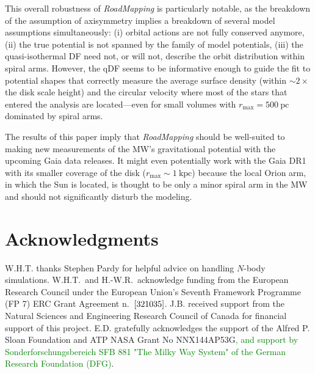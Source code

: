 \documentclass[iop,revtex4,numberedappendix,appendixfloats]{emulateapj}
\newcommand{\RM}{{\sl RoadMapping}}
\newcommand{\NEW}[1]{\textcolor{Green}{#1}}
\newcommand{\OLD}[1]{}
\begin{document}
This overall robustness of \RM{} is particularly notable, as the breakdown of the assumption of axisymmetry implies a breakdown of several model assumptions simultaneously: (i) orbital actions are not fully conserved anymore, (ii) the true potential is not spanned by the family of model potentials, (iii) the quasi-isothermal DF need not, or will not, describe the orbit distribution within spiral arms. However, the qDF seems to be informative enough to guide the fit to potential shapes that correctly measure the average surface density (within $\sim2 \times$ the disk scale height) and the circular velocity where most of the stars that entered the analysis are located---even for small volumes with $r_\text{max}=500~\text{pc}$ dominated by spiral arms. 

\OLD{The simulations we analyzed do not have a prominent bar, and so we have not explicitly explored the impact of such a feature. Bars can play an important role in the dynamics when very small volumes near a resonance are considered (e.g. \citealt{2000AJ....119..800D}). When considering volumes of $\gtrsim 1~\text{kpc}$, we have no reason to believe that this should severely affect the robustness of such an analysis.}

The results of this paper imply that \RM{} should be well-suited to making new measurements of the MW's gravitational potential with the upcoming Gaia data releases. It might even potentially work with the Gaia DR1 with its smaller coverage of the disk ($r_\text{max}\sim 1~\text{kpc}$) because the local Orion arm, in which the Sun is located, is thought to be only a minor spiral arm in the MW and should not significantly disturb the modeling. 


\section{Acknowledgments}

W.H.T. thanks Stephen Pardy for helpful advice on handling $N$-body simulations. W.H.T.\ and H.-W.R.~acknowledge funding from the European Research Council under the European Union’s Seventh Framework Programme (FP 7) ERC Grant Agreement n.~${\rm [321035]}$. J.B. received support from the Natural Sciences and Engineering Research Council of Canada for financial support of this project. E.D. gratefully acknowledges the support of the Alfred P. Sloan Foundation and ATP NASA Grant No NNX144AP53G\NEW{, and support by Sonderforschungsbereich SFB 881 "The Milky Way System" of the German Research Foundation (DFG)}. 


{}

\end{document}

